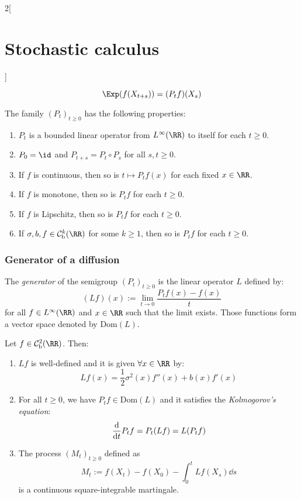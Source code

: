 \documentclass[../../../main_math.tex]{subfiles}
\begin{document}
\begin{multicols}{2}[\section{Stochastic calculus}]
\begin{corollary}
$$      \Exp(f(X_{t+s}))=(P_tf)(X_s)
    $$
  \end{corollary}
  \begin{proposition}
    The family ${(P_t)}_{t\geq 0}$ has the following properties:
    \begin{enumerate}
      \item $P_t$ is a bounded linear operator from $L^\infty(\RR)$ to itself for each $t\geq 0$.
      \item $P_0=\id$ and $P_{t+s}=P_t\circ P_s$ for all $s,t\geq 0$.
      \item If $f$ is continuous, then so is $t\mapsto P_tf(x)$ for each fixed $x\in\RR$.
      \item If $f$ is monotone, then so is $P_tf$ for each $t\geq 0$.
      \item If $f$ is Lipschitz, then so is $P_tf$ for each $t\geq 0$.
      \item If $\sigma, b,f\in\mathcal{C}_\text{b}^k(\RR)$ for some $k\geq 1$, then so is $P_tf$ for each $t\geq 0$.
    \end{enumerate}
  \end{proposition}
  \subsubsection{Generator of a diffusion}
  \begin{definition}[Generator]
    The \emph{generator} of the semigroup ${(P_t)}_{t\geq 0}$ is the linear operator $L$ defined by:
    $$
      (Lf)(x):=\lim_{t\to 0}\frac{P_tf(x)-f(x)}{t}
    $$
    for all $f\in L^\infty(\RR)$ and $x\in\RR$ such that the limit exists. Those functions form a vector space denoted by $\text{Dom}(L)$.
  \end{definition}
  \begin{theorem}
    Let $f\in \mathcal{C}_\text{b}^2(\RR)$. Then:
    \begin{enumerate}
      \item $Lf$ is well-defined and it is given $\forall x\in\RR$ by:
            $$
              Lf(x)=\frac{1}{2}\sigma^2(x)f''(x)+b(x)f'(x)
            $$
      \item For all $t\geq 0$, we have $P_tf\in \text{Dom}(L)$ and it satisfies the \emph{Kolmogorov's equation}:
            $$
              \dv{}{t}P_tf=P_t(Lf)=L(P_tf)
            $$
      \item The process ${(M_t)}_{t\geq 0}$ defined as
            $$
              M_t:=f(X_t)-f(X_0)-\int_0^t Lf(X_s)\dd{s}
            $$
            is a continuous square-integrable martingale.
    \end{enumerate}
  \end{theorem}

\end{multicols}
\end{document}
